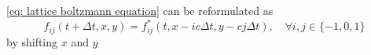 \eqref{eq: lattice boltzmann equation} can be reformulated as
\begin{equation}
  \label{eq: lattice boltzmann equation shifted}
  f_{ij}(t + \Delta t, x, y) = f^*_{ij}(t,x - ic \Delta t , y - cj\Delta t), \quad\forall i,j\in \{-1, 0, 1\}
\end{equation}
by shifting $x$ and $y$
